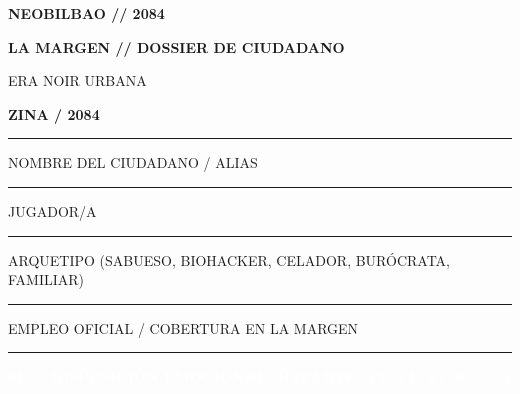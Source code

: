 \documentclass[10pt,a4paper,oneside]{book}
\newcommand{\field}[2][\linewidth]{%
  \begin{minipage}[t]{#1}
  \textcolor{InkSoft}{\terminalfont\scriptsize\MakeUppercase{#2}}\par
  \vspace{1mm}\textcolor{Line}{\rule{\linewidth}{0.45pt}}
  \end{minipage}}
\newcommand{\strip}[1]{%
  \vspace{0.8mm}\noindent
  \colorbox{CarbonDark}{\parbox{\dimexpr\linewidth-2\fboxsep\relax}{%
    \textcolor{white}{\industrialfont\bfseries\small\MakeUppercase{#1}}}}\par
  \vspace{0.8mm}}
\begin{document}
\pagecolor{Paper}

\noindent
\begin{minipage}[c]{0.68\linewidth}
  {\industrialfont\bfseries\fontsize{22}{23}\selectfont\color{CarbonDark}NEOBILBAO // 2084}\par
  \vspace{0.5mm}
  {\industrialfont\bfseries\small\color{UrdinLoteria}LA MARGEN \textcolor{OrekakRust}{//} DOSSIER DE CIUDADANO}
\end{minipage}%
\hfill
\begin{minipage}[c]{0.28\linewidth}
  \raggedleft
  {\terminalfont\scriptsize\color{InkSoft}ERA NOIR URBANA}\par
  {\industrialfont\bfseries\large\color{OrekakRust}ZINA / 2084}
\end{minipage}

\vspace{1mm}
\textcolor{UrdinLoteria}{\rule{\linewidth}{1.2pt}}
\vspace{1mm}

\begin{minipage}[t]{0.58\linewidth}
  \field{Nombre del ciudadano / alias}
\end{minipage}\hfill
\begin{minipage}[t]{0.38\linewidth}
  \field{Jugador/a}
\end{minipage}

\vspace{0.5mm}
\begin{minipage}[t]{0.58\linewidth}
  \field{Arquetipo (Sabueso, Biohacker, Celador, Burócrata, Familiar)}
\end{minipage}\hfill
\begin{minipage}[t]{0.38\linewidth}
  \field{Empleo oficial / Cobertura en La Margen}
\end{minipage}

\strip{01 // Disposición emocional (reparte: +2, +1, +1, 0, 0, -1)}
\end{document}
